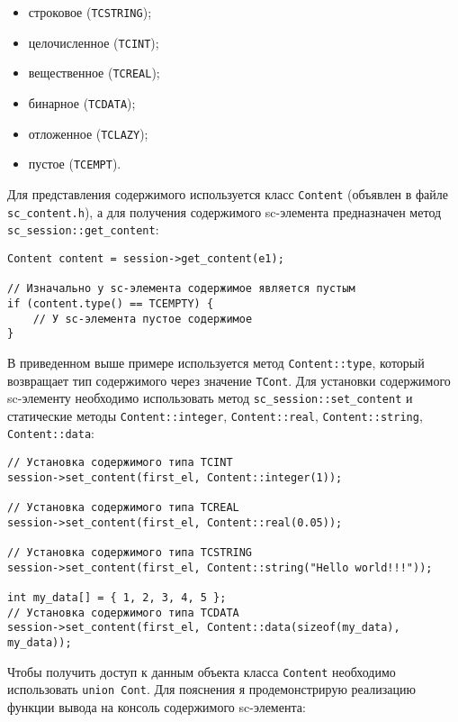 \begin{itemize}
\item строковое (\lstinline|TCSTRING|);
\item целочисленное (\lstinline|TCINT|);
\item вещественное (\lstinline|TCREAL|);
\item бинарное (\lstinline|TCDATA|);
\item отложенное (\lstinline|TCLAZY|);
\item пустое (\lstinline|TCEMPT|).
\end{itemize}

Для представления содержимого используется класс \lstinline|Content|
(объявлен в файле \verb|sc_content.h|), а для получения содержимого
sc-элемента предназначен метод \lstinline|sc_session::get_content|:

\begin{lstlisting}[texcl]
Content content = session->get_content(e1);

// Изначально у sc-элемента содержимое является пустым
if (content.type() == TCEMPTY) {
    // У sc-элемента пустое содержимое
}
\end{lstlisting}

В приведенном выше примере используется метод
\lstinline|Content::type|, который возвращает тип содержимого через
значение \lstinline|TCont|. Для установки содержимого sc-элементу
необходимо использовать метод \lstinline|sc_session::set_content| и
статические методы \lstinline|Content::integer|,
\lstinline|Content::real|, \lstinline|Content::string|,
\lstinline|Content::data|:

\begin{lstlisting}[texcl]
// Установка содержимого типа TCINT
session->set_content(first_el, Content::integer(1));

// Установка содержимого типа TCREAL
session->set_content(first_el, Content::real(0.05));

// Установка содержимого типа TCSTRING
session->set_content(first_el, Content::string("Hello world!!!"));

int my_data[] = { 1, 2, 3, 4, 5 };
// Установка содержимого типа TCDATA
session->set_content(first_el, Content::data(sizeof(my_data), my_data));
\end{lstlisting}

Чтобы получить доступ к данным объекта класса \lstinline|Content|
необходимо использовать \lstinline|union Cont|. Для пояснения я
продемонстрирую реализацию функции вывода на консоль содержимого
sc-элемента:

